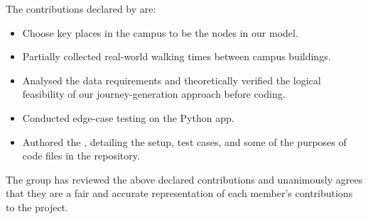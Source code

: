 \documentclass[a4paper,10pt]{amsart}
\begin{document}
The contributions declared by \textbf{\yZhang} are:
\begin{itemize}
    \item Choose key places in the campus to be the nodes in our model.
    \item Partially collected real-world walking times between campus buildings.
    \item Analysed the data requirements and theoretically verified the logical feasibility of our journey-generation approach before coding.
    \item Conducted edge-case testing on the Python app.
    \item Authored the , detailing the setup, test cases, and some of the purposes of code files in the repository.
\end{itemize}

The group has reviewed the above declared contributions and unanimously agrees that they are a fair and accurate representation of each member's contributions to the project.
\end{document}
